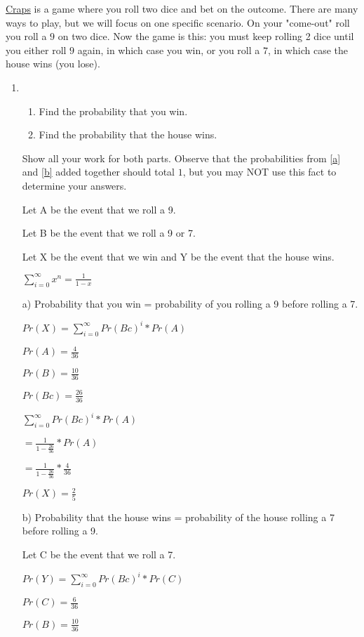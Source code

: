\documentclass[12pt]{article}
\newcounter{ques}
\newenvironment{question}{\stepcounter{ques}{\noindent\bf Question \arabic{ques}:}}{\vspace{5mm}}
\begin{document}
\begin{question}
	\href{https://en.wikipedia.org/wiki/Craps}{Craps} is a game where you roll two dice and bet on the outcome. There are many ways to play, but we will focus on one specific scenario. On your "come-out" roll you roll a $9$ on two dice. Now the game is this: you must keep rolling 2 dice until you either roll $9$ again, in which case you win, or you roll a $7$, in which case the house wins (you lose).
	\begin{enumerate}
		\item \begin{enumerate}
			\item \label{a} Find the probability that you win.
			\item \label{b} Find the probability that the house wins.
		\end{enumerate} 
		 Show all your work for both parts. Observe that the probabilities from \ref{a} and \ref{b} added together should total $1$, but you may NOT use this fact to determine your answers.
		
		Let A be the event that we roll a 9.

		Let B be the event that we roll a 9 or 7.

		Let X be the event that we win and Y be the event that the house wins.

		$\sum_{i=0}^{\infty} x^n = \frac{1}{1-x}$
		
		a) Probability that you win = probability of you rolling a 9 before rolling a 7.
		
		$Pr(X) = \sum_{i=0}^{\infty} Pr(Bc)^i * Pr(A)$
		
		$Pr(A) = \frac{4}{36}$

		$Pr(B) = \frac{10}{36}$

		$Pr(Bc) = \frac{26}{36}$

		$\sum_{i=0}^{\infty} Pr(Bc)^i * Pr(A)$

		$= \frac{1}{1-{\frac{26}{36}}} * Pr(A)$
		
		$= \frac{1}{1-{\frac{26}{36}}} * \frac{4}{36}$

		$Pr(X) = \frac{2}{5}$

		b) Probability that the house wins = probability of the house rolling a 7 before rolling a 9.
		
		Let C be the event that we roll a 7.

		$Pr(Y) = \sum_{i=0}^{\infty} Pr(Bc)^i * Pr(C)$
		
		$Pr(C) = \frac{6}{36}$

		$Pr(B) = \frac{10}{36}$


\end{enumerate}
\end{question}
\end{document}
